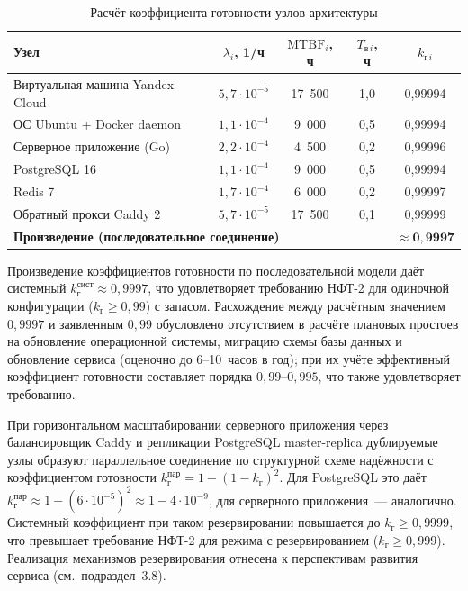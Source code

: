 \begin{table}[!htb]
\fontsize{11pt}{13pt}\selectfont
\centering
\caption{Расчёт коэффициента готовности узлов архитектуры}
\label{tab:reliability}
\smallskip
\begin{tabular}{|l|c|c|c|c|}
    \hline
    \textbf{Узел} & $\lambda_i$, 1/ч & $\mathrm{MTBF}_i$, ч & $T_{\text{в}\,i}$, ч & $k_{\text{г}\,i}$ \\
    \hline
        Виртуальная машина Yandex Cloud   & $5{,}7\cdot 10^{-5}$ & 17~500 & 1{,}0 & 0{,}99994 \\
    \hline
        ОС Ubuntu + Docker daemon         & $1{,}1\cdot 10^{-4}$ &  9~000 & 0{,}5 & 0{,}99994 \\
    \hline
        Серверное приложение (Go)         & $2{,}2\cdot 10^{-4}$ &  4~500 & 0{,}2 & 0{,}99996 \\
    \hline
        PostgreSQL 16                     & $1{,}1\cdot 10^{-4}$ &  9~000 & 0{,}5 & 0{,}99994 \\
    \hline
        Redis 7                           & $1{,}7\cdot 10^{-4}$ &  6~000 & 0{,}2 & 0{,}99997 \\
    \hline
        Обратный прокси Caddy 2           & $5{,}7\cdot 10^{-5}$ & 17~500 & 0{,}1 & 0{,}99999 \\
    \hline
        \multicolumn{4}{|l|}{\textbf{Произведение (последовательное соединение)}} & $\mathbf{\approx 0{,}9997}$ \\
    \hline
\end{tabular}
\end{table}
\FloatBarrier

Произведение коэффициентов готовности по последовательной модели
даёт системный $k_\text{г}^\text{сист} \approx 0{,}9997$, что
удовлетворяет требованию НФТ-2 для одиночной конфигурации
($k_\text{г} \geq 0{,}99$) с запасом. Расхождение между расчётным
значением $0{,}9997$ и заявленным $0{,}99$ обусловлено отсутствием
в расчёте плановых простоев на обновление операционной системы,
миграцию схемы базы данных и обновление сервиса (оценочно
до 6--10~часов в год); при их учёте эффективный коэффициент
готовности составляет порядка $0{,}99$--$0{,}995$, что также
удовлетворяет требованию.

При горизонтальном масштабировании серверного приложения через
балансировщик Caddy и репликации PostgreSQL master-replica
дублируемые узлы образуют параллельное соединение по структурной
схеме надёжности с коэффициентом готовности
$k_\text{г}^\text{пар} = 1 - (1 - k_\text{г})^2$. Для PostgreSQL
это даёт $k_\text{г}^\text{пар} \approx 1 - (6\cdot 10^{-5})^2 \approx 1 - 4\cdot 10^{-9}$,
для серверного приложения~--- аналогично. Системный коэффициент
при таком резервировании повышается до $k_\text{г} \geq 0{,}9999$,
что превышает требование НФТ-2 для режима с резервированием
($k_\text{г} \geq 0{,}999$). Реализация механизмов резервирования
отнесена к перспективам развития сервиса (см.~подраздел~3.8).

